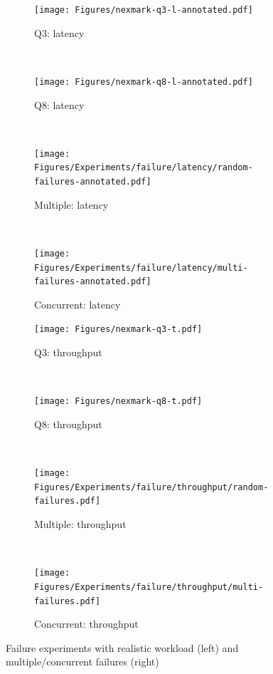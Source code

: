 \documentclass[sigconf]{acmart}
\begin{document}
\begin{figure}[!t]
	\begin{subfigure}[t]{0.25\textwidth}
		\centering
		\texttt{[image: Figures/nexmark-q3-l-annotated.pdf]}
		\caption{Q3: latency}
		\label{fig:nexmark-q3-l}
	\end{subfigure}%
	~
	\begin{subfigure}[t]{0.25\textwidth}
		\centering
		\texttt{[image: Figures/nexmark-q8-l-annotated.pdf]}
		\caption{Q8: latency}
		\label{fig:nexmark-q8-l}
	\end{subfigure}%
	~
	\begin{subfigure}[t]{.25\textwidth}
		\centering
		\texttt{[image: Figures/Experiments/failure/latency/random-failures-annotated.pdf]}
		\caption{Multiple: latency}
		\label{fig:multiple-l}
	\end{subfigure}%
	~
	\begin{subfigure}[t]{.25\textwidth}
		\centering
		\texttt{[image: Figures/Experiments/failure/latency/multi-failures-annotated.pdf]}
		\caption{Concurrent: latency}
		\label{fig:concurrent-l}
	\end{subfigure}%

	
	\begin{subfigure}[t]{0.25\textwidth}
		\centering
		\texttt{[image: Figures/nexmark-q3-t.pdf]}
		\caption{Q3: throughput}
		\label{fig:nexmark-q3-t}
	\end{subfigure}%
	~
	\begin{subfigure}[t]{0.25\textwidth}
		\centering
		\texttt{[image: Figures/nexmark-q8-t.pdf]}
		\caption{Q8: throughput}
		\label{fig:nexmark-q8-t}
	\end{subfigure}%
	~
	\begin{subfigure}[t]{.25\textwidth}
		\centering
		\texttt{[image: Figures/Experiments/failure/throughput/random-failures.pdf]}
		\caption{Multiple: throughput}
		\label{fig:multiple-t}
	\end{subfigure}%
	~
	\begin{subfigure}[t]{.25\textwidth}
		\centering
		\texttt{[image: Figures/Experiments/failure/throughput/multi-failures.pdf]}
		\caption{Concurrent: throughput}
		\label{fig:concurrent-t}
	\end{subfigure}%
	\vspace{-2mm}
	\caption{Failure experiments with realistic workload (left) and multiple/concurrent failures (right)}
  \label{fig:experiment-grid}
  	\vspace{-2mm}
\end{figure}
\end{document}
